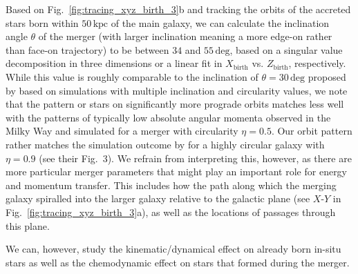 \documentclass[fleqn,usenatbib]{mnras}
\begin{document}
 Based on Fig.~\ref{fig:tracing_xyz_birth_3}b and tracking the orbits of the accreted stars born within $50\,\mathrm{kpc}$ of the main galaxy, we can calculate the inclination angle $\theta$ of the merger (with larger inclination meaning a more edge-on rather than face-on trajectory) to be between $34$ and $55\,\mathrm{deg}$, based on a singular value decomposition in three dimensions or a linear fit in $X_\mathrm{birth}$ vs. $Z_\mathrm{birth}$, respectively. While this value is roughly comparable to the inclination of $\theta = 30\,\mathrm{deg}$ proposed by \citet{Naidu2021} based on simulations with multiple inclination and circularity values, we note that the pattern or stars on significantly more prograde orbits matches less well with the patterns of typically low absolute angular momenta observed in the Milky Way and simulated for a merger with circularity $\eta = 0.5$. Our orbit pattern rather matches the simulation outcome by \citet{Naidu2021} for a highly circular galaxy with $\eta = 0.9$ (see their Fig.~3). We refrain from interpreting this, however, as there are more particular merger parameters that might play an important role for energy and momentum transfer. This includes how the path along which the merging galaxy spiralled into the larger galaxy relative to the galactic plane (see $X$-$Y$ in Fig.~\ref{fig:tracing_xyz_birth_3}a), as well as the locations of passages through this plane.

We can, however, study the kinematic/dynamical effect on already born in-situ stars as well as the chemodynamic effect on stars that formed during the merger.
\end{document}
